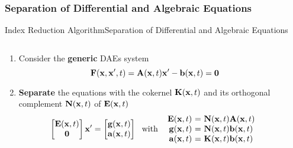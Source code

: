 \subsubsection{Separation of Differential and Algebraic Equations}

\begin{frame}{Index Reduction Algorithm}{Separation of Differential and Algebraic Equations}
  \vspace{-1.0em}
  \begin{columns}
    \begin{column}[c]{0.6\textwidth}
      \begin{enumerate}
        \item Consider the \textbf{generic} \acsp{DAE} system
        \begin{equation*}
          \mathbf{F}(\mathbf{x}, \mathbf{x}^\prime, t) = \mathbf{A}(\mathbf{x}, t) \mathbf{x}^\prime - \mathbf{b}(\mathbf{x}, t) = \mathbf{0}
        \end{equation*}
        \item \textbf{Separate} the equations with the cokernel $\mathbf{K}(\mathbf{x}, t)$ and its orthogonal complement $\mathbf{N}(\mathbf{x}, t)$ of $\mathbf{E}(\mathbf{x}, t)$
        \begin{equation*}
          \begin{bmatrix} \mE \\ \m{0} \end{bmatrix} \mxp = \begin{bmatrix} \mg \\ \ma \end{bmatrix}
          ~~ \text{with} ~~
          \begin{array}{r@{~}c@{~}l}
            \mE &=& \mN \mA \\
            \mg &=& \mN \mb \\
            \ma &=& \mK \mb
          \end{array}
        \end{equation*}
      \end{enumerate}
    \end{column}
    \begin{column}[c]{0.4\textwidth}
    \end{column}
  \end{columns}
\end{frame}

